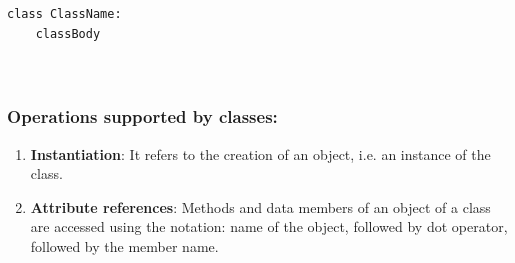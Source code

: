 \documentclass[11pt]{article}
\providecommand{\tightlist}{%
      \setlength{\itemsep}{0pt}\setlength{\parskip}{0pt}}
\begin{document}
\begin{verbatim}
class ClassName:
    classBody
    
    
\end{verbatim}

\subsubsection{ Operations supported by classes:
}\label{operations-supported-by-classes}

\begin{enumerate}
\def\labelenumi{\arabic{enumi}.}
\tightlist
\item
  \textbf{Instantiation}: It refers to the creation of an object, i.e.
  an instance of the class.
\item
  \textbf{Attribute references}: Methods and data members of an object
  of a class are accessed using the notation: name of the object,
  followed by dot operator, followed by the member name.
\end{enumerate}
\end{document}
